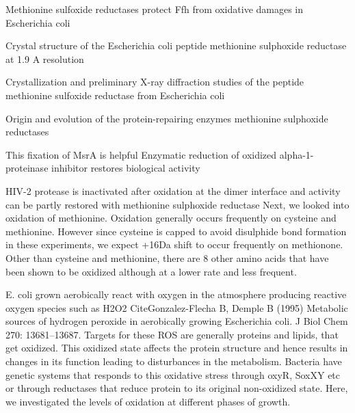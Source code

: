 \documentclass[12pt]{article}
\begin{document}
\cite{Ezratyetal2004}
{Methionine sulfoxide reductases protect Ffh from oxidative damages in Escherichia coli}

\cite{Tete-Favieretal2000}
{Crystal structure of the Escherichia coli peptide methionine sulphoxide reductase at 1.9 A resolution}
   
\cite{Tete-Favieretal2000b}
{Crystallization and preliminary X-ray diffraction studies of the peptide methionine sulfoxide reductase from Escherichia coli}
   
\cite{ZhangWeissbach2008}
{Origin and evolution of the protein-repairing enzymes methionine sulphoxide reductases}
   
This fixation of MsrA is helpful \cite{Abramsetal1981}
{Enzymatic reduction of oxidized alpha-1-proteinase inhibitor restores biological activity}

\cite{Davisetal2000}
{HIV-2 protease is inactivated after oxidation at the dimer interface and activity can be partly restored with methionine sulphoxide reductase}
Next, we looked into oxidation of methionine. Oxidation generally occurs frequently on cysteine and methionine. However since cysteine is capped to avoid disulphide bond formation in these experiments, we expect +16Da shift to occur frequently on methionone. Other than cysteine and methionine, there are 8 other amino acids that have been shown to be oxidized although at a lower rate and less frequent. 

E. coli grown aerobically react with oxygen in the atmosphere producing reactive oxygen species such as H2O2 {CiteGonzalez-Flecha B, Demple B (1995) Metabolic sources of hydrogen peroxide in aerobically growing Escherichia coli. J Biol Chem 270: 13681–13687}. Targets for these ROS are generally proteins and lipids, that get oxidized. This oxidized state affects the protein structure and hence results in changes in its function leading to disturbances in the metabolism. Bacteria have genetic systems that responds to this oxidative stress through oxyR, SoxXY etc or through reductases that reduce protein to its original non-oxidized state. Here, we investigated the levels of oxidation at different phases of growth.
\end{document}
